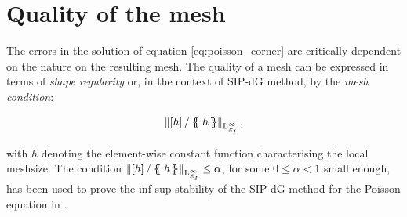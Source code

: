 \documentclass[a4paper,11pt]{article}
\begin{document}
\section{Quality of the mesh}
\label{sec:quality_measure}

The errors in the solution of equation \eqref{eq:poisson_corner} are critically dependent on the nature on the resulting mesh. The quality of a mesh can be expressed in terms of \textit{shape regularity} or, in the context of SIP-dG method, by the \textit{mesh condition}:

\begin{equation}
    \Norm{\jump{h}/\avg{h}}_{\leb{\infty}_{\cE_{I}}},
\end{equation}

with $h$ denoting the element-wise constant function characterising the local meshsize. The condition $\Norm{\jump{h}/\avg{h}}_{\leb{\infty}_{\cE_{I}}}\leq \alpha$, for some $0 \leq \alpha < 1$ small enough, has been used to prove the inf-sup stability of the SIP-dG method for the Poisson equation in \cite{GMP:2017}. 
\end{document}
